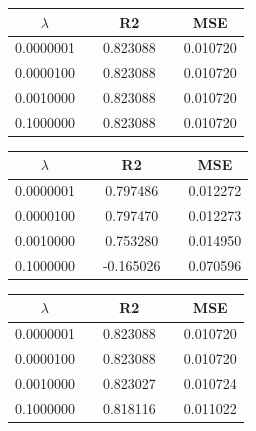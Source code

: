  \begin{center}
 \label{tab:Realdata_OLS_lambda_R2_MSE}
 \begin{tabularx}{\textwidth}{c X c X c  }
     \hline
     \hline
$\lambda$    &&R2     &&MSE     \\
         \hline
0.0000001 && 0.823088 && 0.010720 \\
0.0000100 && 0.823088 && 0.010720 \\
0.0010000 && 0.823088 && 0.010720 \\
0.1000000 && 0.823088 && 0.010720 \\
 \end{tabularx}
 \end{center}
 
\pagebreak
 
 \begin{center}
 \label{tab:Realdata_Lasso_lambda_R2_MSE}
 \begin{tabularx}{\textwidth}{c X c X c  }
     \hline
     \hline
$\lambda$    &&R2     &&MSE     \\
         \hline
0.0000001 && 0.797486 && 0.012272 \\
0.0000100 && 0.797470 && 0.012273 \\
0.0010000 && 0.753280 && 0.014950 \\
0.1000000 && -0.165026 && 0.070596 \\
 \end{tabularx}
 \end{center}

 \begin{center}
 \label{tab:Realdata_Ridge_lambda_R2_MSE}
 \begin{tabularx}{\textwidth}{c X c X c  }
     \hline
     \hline
$\lambda$    &&R2     &&MSE     \\
         \hline
0.0000001 && 0.823088 && 0.010720 \\
0.0000100 && 0.823088 && 0.010720 \\
0.0010000 && 0.823027 && 0.010724 \\
0.1000000 && 0.818116 && 0.011022 \\
 \end{tabularx}
 \end{center}






